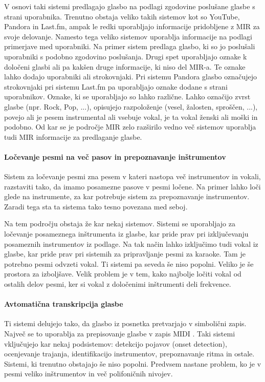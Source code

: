 \documentclass[a4paper, 12pt]{book}
\begin{document}
{V osnovi taki sistemi predlagajo glasbo na podlagi zgodovine poslušane glasbe s strani uporabnika. Trenutno obstaja veliko takih sistemov kot so YouTube, Pandora in Last.fm, ampak le redki uporabljajo informacije pridobljene z MIR za svoje delovanje. Namesto tega veliko sistemov uporablja informacije na podlagi primerjave med uporabniki. Na primer sistem predlaga glasbo, ki so jo poslušali uporabniki s podobno zgodovino poslušanja. Drugi spet uporabljajo oznake k določeni glasbi ali pa kakšen druge informacije, ki niso del MIR-a. Te oznake lahko dodajo uporabniki ali strokovnjaki. Pri sistemu Pandora glasbo označujejo strokovnjaki pri sistemu Last.fm pa uporabljajo oznake dodane s strani uporabnikov. Oznake, ki se uporabljajo so lahko različne. Lahko označijo zvrst glasbe (npr. Rock, Pop, ...), opisujejo razpoloženje (vesel, žalosten, sproščen, ...), povejo ali je pesem instrumental ali vsebuje vokal, je ta vokal ženski ali moški in podobno. Od kar se je področje MIR zelo razširilo vedno več sistemov uporablja tudi MIR informacije za predlaganje glasbe. 
 
\paragraph{Ločevanje pesmi na več pasov in prepoznavanje inštrumentov}

Sistem za ločevanje pesmi zna pesem v kateri nastopa več instrumentov in vokali, razstaviti tako, da imamo posamezne pasove v pesmi ločene. Na primer lahko loči glede na instrumente, za kar potrebuje sistem za prepoznavanje instrumentov. Zaradi tega sta ta sistema tako tesno povezana med seboj. 

Na tem področju obstaja že kar nekaj sistemov. Sistemi se uporabljajo za ločevanje posameznega inštrumenta iz glasbe, kar pride prav pri izključevanju posameznih instrumentov iz podlage. Na tak način lahko izključimo tudi vokal iz glasbe, kar pride prav pri sistemih za pripravljanje pesmi za karaoke. Tam je potrebno pesmi odvzeti vokal. Ti sistemi pa seveda še niso popolni. Veliko je še prostora za izboljšave. Velik problem je v tem, kako najbolje ločiti vokal od ostalih delov pesmi, ker si vokal z določenimi inštrumenti deli frekvence. 

\paragraph{Avtomatična transkripcija glasbe}

Ti sistemi delujejo tako, da glasbo iz posnetka pretvarjajo v simbolični zapis. \cite{gerhard2003pitch, klapuri2006signal, klapuri2004automatic} Največ se to uporablja za prepisovanje glasbe v zapis MIDI \cite{huber2007midi}. Taki sistemi vključujejo kar nekaj podsistemov: detekcijo pojavov (onset detection), ocenjevanje trajanja, identifikacijo instrumentov, prepoznavanje ritma in ostale. Sistemi, ki trenutno obstajajo še niso popolni. Predvsem nastane problem, ko je v pesmi veliko inštrumentov in več polifoničnih nivojev. 

}
\end{document}
